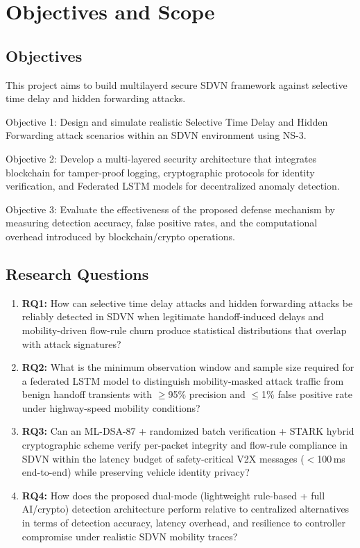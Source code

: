 \documentclass[12pt, a4paper]{report}
\begin{document}
\section{Objectives and Scope}

\subsection{Objectives}

This project aims to build multilayerd secure SDVN framework against selective time delay and hidden forwarding attacks.

Objective 1: Design and simulate realistic Selective Time Delay and Hidden Forwarding attack scenarios within an SDVN environment using NS-3.


Objective 2: Develop a multi-layered security architecture that integrates blockchain for tamper-proof logging, cryptographic protocols for identity verification, and Federated LSTM models for decentralized anomaly detection.


Objective 3: Evaluate the effectiveness of the proposed defense mechanism by measuring detection accuracy, false positive rates, and the computational overhead introduced by blockchain/crypto operations.


\subsection{Research Questions}
\label{sec:rqs}

\begin{enumerate}
    \item \textbf{RQ1: }How can selective time delay attacks and hidden forwarding 
    attacks be reliably detected in SDVN when legitimate handoff-induced 
    delays and mobility-driven flow-rule churn produce statistical 
    distributions that overlap with attack signatures?
    
    \item \textbf{RQ2: }What is the minimum observation window and sample size 
    required for a federated LSTM model to distinguish mobility-masked 
    attack traffic from benign handoff transients with $\geq$95\% 
    precision and $\leq$1\% false positive rate under highway-speed 
    mobility conditions?
    
    \item \textbf{RQ3: }Can an ML-DSA-87 + randomized batch verification + STARK hybrid cryptographic 
    scheme verify per-packet integrity and flow-rule compliance in SDVN 
    within the latency budget of safety-critical V2X messages ($<$100\,ms 
    end-to-end) while preserving vehicle identity privacy?
    
    \item \textbf{RQ4: }How does the proposed dual-mode (lightweight rule-based + full 
    AI/crypto) detection architecture perform relative to centralized 
    alternatives in terms of detection accuracy, latency overhead, and 
    resilience to controller compromise under realistic SDVN mobility 
    traces?
\end{enumerate}
\end{document}
